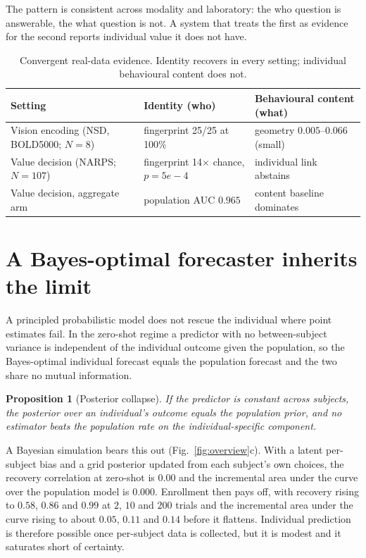 \documentclass[11pt]{article}
\newtheorem{proposition}{Proposition}
\begin{document}
The pattern is consistent across modality and laboratory: the who question is answerable, the what question
is not. A system that treats the first as evidence for the second reports individual value it does not have.

\begin{table}[t]
\centering\small
\caption{Convergent real-data evidence. Identity recovers in every setting; individual behavioural content
does not.}
\label{tab:real}
\begin{tabular}{@{}lll@{}}
\toprule
Setting & Identity (who) & Behavioural content (what) \\
\midrule
Vision encoding (NSD, BOLD5000; $N{=}8$) & fingerprint 25/25 at 100\% & geometry $0.005$--$0.066$ (small) \\
Value decision (NARPS; $N{=}107$) & fingerprint 14$\times$ chance, $p{=}5e{-}4$ & individual link abstains \\
Value decision, aggregate arm & population AUC $0.965$ & content baseline dominates \\
\bottomrule
\end{tabular}
\end{table}

\section*{A Bayes-optimal forecaster inherits the limit}
A principled probabilistic model does not rescue the individual where point estimates fail. In the zero-shot
regime a predictor with no between-subject variance is independent of the individual outcome given the
population, so the Bayes-optimal individual forecast equals the population forecast and the two share no
mutual information.

\begin{proposition}[Posterior collapse]
If the predictor is constant across subjects, the posterior over an individual's outcome equals the
population prior, and no estimator beats the population rate on the individual-specific component.
\end{proposition}

A Bayesian simulation bears this out (Fig.~\ref{fig:overview}c). With a latent per-subject bias and a grid
posterior updated from each subject's own choices, the recovery correlation at zero-shot is $0.00$ and the
incremental area under the curve over the population model is $0.000$. Enrollment then pays off, with
recovery rising to $0.58$, $0.86$ and $0.99$ at $2$, $10$ and $200$ trials and the incremental area under the
curve rising to about $0.05$, $0.11$ and $0.14$ before it flattens. Individual prediction is therefore
possible once per-subject data is collected, but it is modest and it saturates short of certainty.
\end{document}
